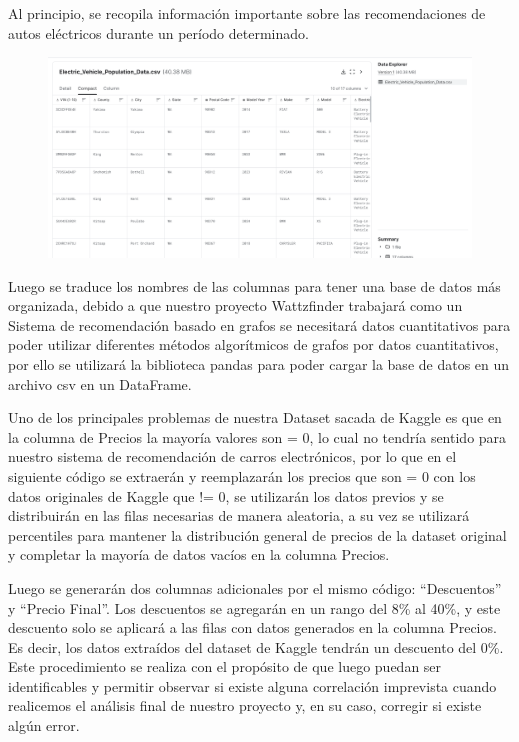 \documentclass[12pt]{article}
\begin{document}
Al principio, se recopila información importante sobre las recomendaciones de autos eléctricos durante un período determinado.


\begin{figure}[htbp]
    \centering
    \includegraphics[width=\textwidth]{./imgs-latex/dataExplorer-csv-screenshot-img1.png}\label{fig:dataExplorer-csv-screenshot-img1}
\end{figure}
    

Luego se traduce los nombres de las columnas para tener una base de datos más organizada, debido a que nuestro proyecto Wattzfinder trabajará como un Sistema de recomendación basado en grafos se necesitará datos cuantitativos para poder utilizar diferentes métodos algorítmicos de grafos por datos cuantitativos, por ello se utilizará la biblioteca pandas para poder cargar la base de datos en un archivo csv en un DataFrame. 

Uno de los principales problemas de nuestra Dataset sacada de Kaggle es que en la columna de Precios la mayoría valores son = 0, lo cual no tendría sentido para nuestro sistema de recomendación de carros electrónicos, por lo que en el siguiente código se extraerán y reemplazarán los precios que son = 0 con los datos originales de Kaggle que != 0, se utilizarán los datos previos y se distribuirán en las filas necesarias de manera aleatoria, a su vez se utilizará percentiles para mantener la distribución general de precios de la dataset original y completar la mayoría de datos vacíos en la columna Precios.


Luego se generarán dos columnas adicionales por el mismo código: ``Descuentos'' y ``Precio Final''. Los descuentos se agregarán en un rango del 8\% al 40\%, y este descuento solo se aplicará a las filas con datos generados en la columna Precios. Es decir, los datos extraídos del dataset de Kaggle tendrán un descuento del 0\%. Este procedimiento se realiza con el propósito de que luego puedan ser identificables y permitir observar si existe alguna correlación imprevista cuando realicemos el análisis final de nuestro proyecto y, en su caso, corregir si existe algún error.
\end{document}
